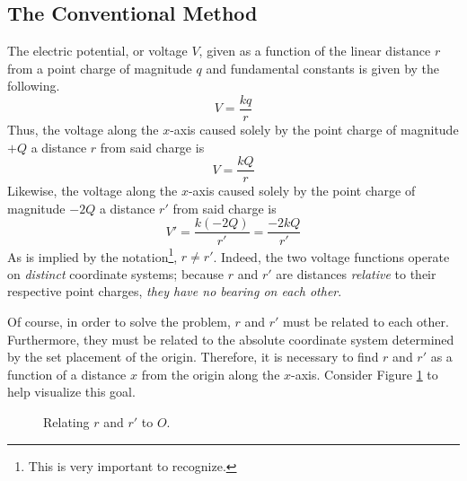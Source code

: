 \documentclass[titlepage]{article}
\begin{document}
\subsection*{The Conventional Method}
The electric potential, or voltage $V$, given as a function of the linear distance $r$ from a point charge of magnitude $q$ and fundamental constants is given by the following.
\begin{equation*}
    V=\frac{kq}{r}
\end{equation*}
Thus, the voltage along the $x$-axis caused solely by the point charge of magnitude $+Q$ a distance $r$ from said charge is $$V=\frac{kQ}{r}$$Likewise, the voltage along the $x$-axis caused solely by the point charge of magnitude $-2Q$ a distance $r'$ from said charge is $$V'=\frac{k(-2Q)}{r'}=\frac{-2kQ}{r'}$$As is implied by the notation\footnote{This is very important to recognize.}, $r\neq r'$. Indeed, the two voltage functions operate on \emph{distinct} coordinate systems; because $r$ and $r'$ are distances \emph{relative} to their respective point charges, \emph{they have no bearing on each other}.\par
Of course, in order to solve the problem, $r$ and $r'$ must be related to each other. Furthermore, they must be related to the absolute coordinate system determined by the set placement of the origin. Therefore, it is necessary to find $r$ and $r'$ as a function of a distance $x$ from the origin along the $x$-axis. Consider Figure \ref{fig:rAndrPrime} to help visualize this goal.

\begin{figure}[h!]
    \centering
    \caption{Relating $r$ and $r'$ to $O$.}
    \label{fig:rAndrPrime}
\end{figure}
\end{document}
